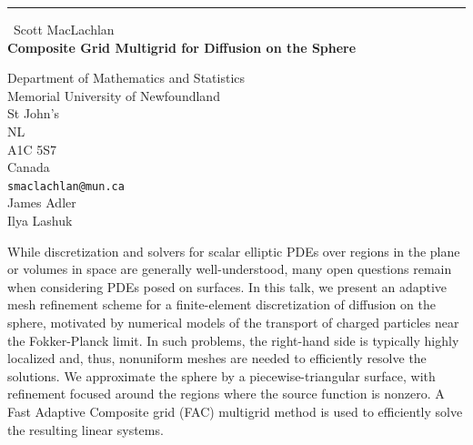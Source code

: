 \documentclass{report}
\begin{document}
\begin{center}
\rule{6in}{1pt} \
{\large Scott MacLachlan \\
{\bf Composite Grid Multigrid for Diffusion on the Sphere}}

Department of Mathematics and Statistics \\ Memorial University of Newfoundland \\ St John's \\ NL \\ A1C 5S7 \\ Canada
\\
{\tt smaclachlan@mun.ca}\\
James Adler\\
Ilya Lashuk\end{center}

While discretization and solvers for scalar elliptic PDEs
over regions in the plane or volumes in space are generally
well-understood, many open questions remain when considering PDEs
posed on surfaces. In this talk, we present an adaptive mesh
refinement scheme for a finite-element discretization of diffusion on
the sphere, motivated by numerical models of the transport of charged
particles near the Fokker-Planck limit. In such problems, the
right-hand side is typically highly localized and, thus, nonuniform
meshes are needed to efficiently resolve the solutions. We
approximate the sphere by a piecewise-triangular surface, with
refinement focused around the regions where the source function is
nonzero. A Fast Adaptive Composite grid (FAC) multigrid method is
used to efficiently solve the resulting linear systems.
\end{document}
